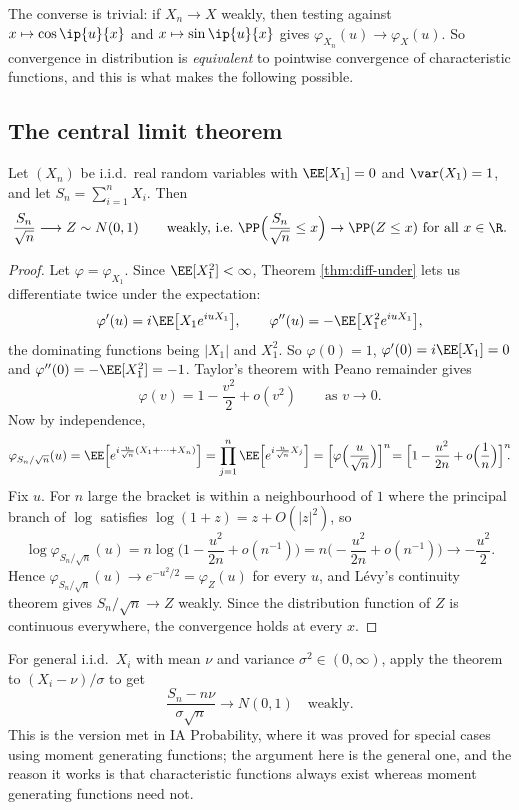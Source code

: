The converse is trivial: if $X_n \to X$ weakly, then testing against $x \mapsto \cos\ip{u}{x}$ and $x\mapsto\sin\ip{u}{x}$ gives $\varphi_{X_n}(u)\to\varphi_X(u)$. So convergence in distribution is \emph{equivalent} to pointwise convergence of characteristic functions, and this is what makes the following possible.

\subsection{The central limit theorem}

\begin{theorem}\label{thm:clt}
	Let $(X_n)$ be i.i.d.\ real random variables with $\EE[X_1]=0$ and $\var(X_1)=1$, and let $S_n = \sum_{i=1}^n X_i$. Then
	$$
	\frac{S_n}{\sqrt n} \longrightarrow Z \sim N(0,1) \qquad \text{weakly, i.e.\ } \PP\Big(\frac{S_n}{\sqrt n}\leq x\Big)\to\PP(Z \leq x) \text{ for all } x \in \R.
	$$
\end{theorem}
\begin{proof}
	Let $\varphi = \varphi_{X_1}$. Since $\EE[X_1^2]<\infty$, Theorem \ref{thm:diff-under} lets us differentiate twice under the expectation:
	$$
	\varphi'(u)=i\EE\big[X_1e^{iuX_1}\big], \qquad \varphi''(u)=-\EE\big[X_1^2e^{iuX_1}\big],
	$$
	the dominating functions being $|X_1|$ and $X_1^2$. So $\varphi(0)=1$, $\varphi'(0)=i\EE[X_1]=0$ and $\varphi''(0)=-\EE[X_1^2]=-1$. Taylor's theorem with Peano remainder gives
	$$
	\varphi(v) = 1 - \frac{v^2}{2}+o(v^2) \qquad \text{as } v \to 0.
	$$
	Now by independence,
	$$
	\varphi_{S_n/\sqrt n}(u) = \EE\Big[e^{i\frac{u}{\sqrt n}(X_1+\cdots+X_n)}\Big]=\prod_{j=1}^n\EE\Big[e^{i\frac{u}{\sqrt n}X_j}\Big]=\Big[\varphi\Big(\frac{u}{\sqrt n}\Big)\Big]^n\! = \Big[1 - \frac{u^2}{2n}+o\Big(\frac1n\Big)\Big]^n\!\!.
	$$
	Fix $u$. For $n$ large the bracket is within a neighbourhood of $1$ where the principal branch of $\log$ satisfies $\log(1+z)=z+O(|z|^2)$, so
	$$
	\log \varphi_{S_n/\sqrt n}(u) = n\log\Big(1-\frac{u^2}{2n}+o(n^{-1})\Big) = n\Big(-\frac{u^2}{2n}+o(n^{-1})\Big)\longrightarrow -\frac{u^2}{2}.
	$$
	Hence $\varphi_{S_n/\sqrt n}(u)\to e^{-u^2/2}=\varphi_Z(u)$ for every $u$, and L\'evy's continuity theorem gives $S_n/\sqrt n \to Z$ weakly. Since the distribution function of $Z$ is continuous everywhere, the convergence holds at every $x$.
\end{proof}

\begin{remark}
	For general i.i.d.\ $X_i$ with mean $\nu$ and variance $\sigma^2 \in(0,\infty)$, apply the theorem to $(X_i-\nu)/\sigma$ to get
	$$
	\frac{S_n - n\nu}{\sigma\sqrt n}\longrightarrow N(0,1) \quad \text{weakly.}
	$$
	This is the version met in IA Probability, where it was proved for special cases using moment generating functions; the argument here is the general one, and the reason it works is that characteristic functions always exist whereas moment generating functions need not.
\end{remark}

